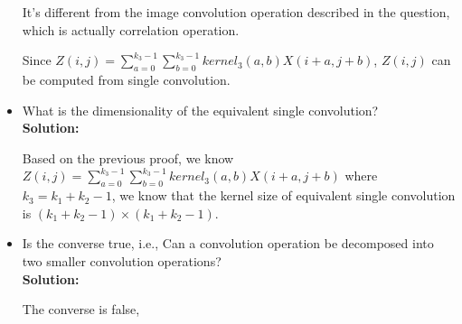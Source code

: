 \documentclass[12pt]{article}%
\begin{document}
\begin{itemize}
        It's different from the image convolution operation described in the question, which is actually correlation operation.
        \par Since $Z(i,j) = \sum_{a=0}^{k_3-1}\sum_{b=0}^{k_3-1}kernel_3(a,b)X(i+a,j+b)$, $Z(i,j)$ can be computed from single convolution.
        \item What is the dimensionality of the equivalent single convolution?\\
        {\bf Solution:}
        \par Based on the previous proof, we know $Z(i,j) = \sum_{a=0}^{k_3-1}\sum_{b=0}^{k_3-1}kernel_3(a,b)X(i+a,j+b)$ where $k_3=k_1+k_2-1$,
        we know that the kernel size of equivalent single convolution is $(k_1+k_2-1)\times (k_1+k_2-1)$.
        \item Is the converse true, i.e.,
        Can a convolution operation be decomposed into two smaller convolution operations?\\
        {\bf Solution:}
        \par The converse is false,
    \end{itemize}
\end{document}
